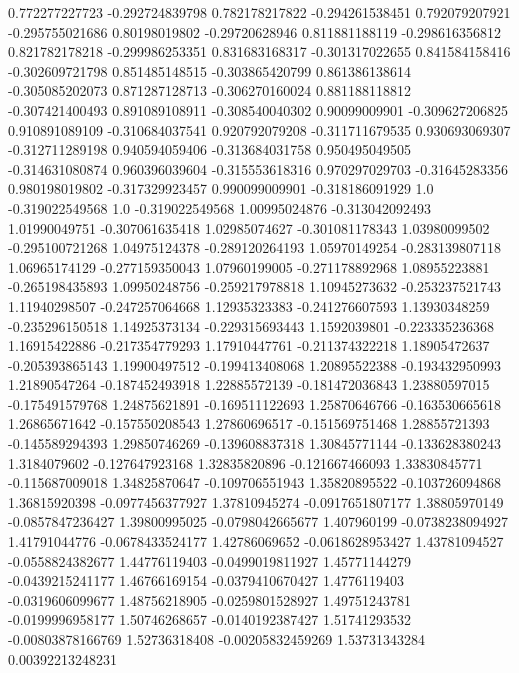  0.772277227723  -0.292724839798
 0.782178217822  -0.294261538451
 0.792079207921  -0.295755021686
  0.80198019802   -0.29720628946
 0.811881188119  -0.298616356812
 0.821782178218  -0.299986253351
 0.831683168317  -0.301317022655
 0.841584158416  -0.302609721798
 0.851485148515  -0.303865420799
 0.861386138614  -0.305085202073
 0.871287128713  -0.306270160024
 0.881188118812  -0.307421400493
 0.891089108911  -0.308540040302
  0.90099009901  -0.309627206825
 0.910891089109  -0.310684037541
 0.920792079208  -0.311711679535
 0.930693069307  -0.312711289198
 0.940594059406  -0.313684031758
 0.950495049505  -0.314631080874
 0.960396039604  -0.315553618316
 0.970297029703   -0.31645283356
 0.980198019802  -0.317329923457
 0.990099009901  -0.318186091929
            1.0  -0.319022549568
            1.0  -0.319022549568
  1.00995024876  -0.313042092493
  1.01990049751  -0.307061635418
  1.02985074627  -0.301081178343
  1.03980099502  -0.295100721268
  1.04975124378  -0.289120264193
  1.05970149254  -0.283139807118
  1.06965174129  -0.277159350043
  1.07960199005  -0.271178892968
  1.08955223881  -0.265198435893
  1.09950248756  -0.259217978818
  1.10945273632  -0.253237521743
  1.11940298507  -0.247257064668
  1.12935323383  -0.241276607593
  1.13930348259  -0.235296150518
  1.14925373134  -0.229315693443
   1.1592039801  -0.223335236368
  1.16915422886  -0.217354779293
  1.17910447761  -0.211374322218
  1.18905472637  -0.205393865143
  1.19900497512  -0.199413408068
  1.20895522388  -0.193432950993
  1.21890547264  -0.187452493918
  1.22885572139  -0.181472036843
  1.23880597015  -0.175491579768
  1.24875621891  -0.169511122693
  1.25870646766  -0.163530665618
  1.26865671642  -0.157550208543
  1.27860696517  -0.151569751468
  1.28855721393  -0.145589294393
  1.29850746269  -0.139608837318
  1.30845771144  -0.133628380243
   1.3184079602  -0.127647923168
  1.32835820896  -0.121667466093
  1.33830845771  -0.115687009018
  1.34825870647  -0.109706551943
  1.35820895522  -0.103726094868
  1.36815920398  -0.0977456377927
  1.37810945274  -0.0917651807177
  1.38805970149  -0.0857847236427
  1.39800995025  -0.0798042665677
    1.407960199  -0.0738238094927
  1.41791044776  -0.0678433524177
  1.42786069652  -0.0618628953427
  1.43781094527  -0.0558824382677
  1.44776119403  -0.0499019811927
  1.45771144279  -0.0439215241177
  1.46766169154  -0.0379410670427
   1.4776119403  -0.0319606099677
  1.48756218905  -0.0259801528927
  1.49751243781  -0.0199996958177
  1.50746268657  -0.0140192387427
  1.51741293532  -0.00803878166769
  1.52736318408  -0.00205832459269
  1.53731343284  0.00392213248231
